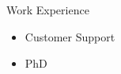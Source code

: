 \begin{frame}{Work Experience}
%
  \begin{itemize}\itemfill
    \item Customer Support
    \item PhD
  \end{itemize}
%
\end{frame}
